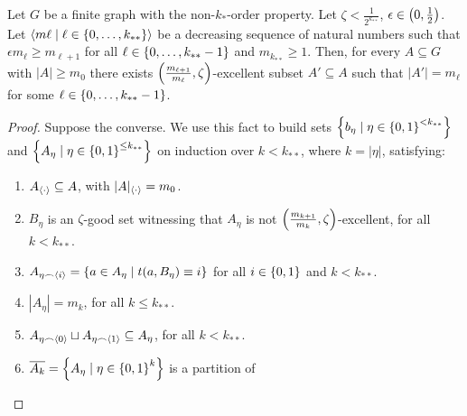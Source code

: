     \begin{lemma}[Claim 5.4.1] \label{lem:existance_of_excellent_subsets_fixed_size_choices}
        Let $G$ be a finite graph with the non-$k_{*}$-order property.
        Let $\zeta < \frac{1}{2^{k_{**}}}$, $\epsilon \in \left( 0, \frac{1}{2} \right)$.
        Let $\left< m\ell \mid \ell \in \left\{ 0, \dots, k_{**} \right\} \right>$ be a decreasing sequence of natural numbers such that
        $\epsilon m_{\ell} \geq m_{\ell+1}$ for all $\ell \in \left\{ 0, \dots, k_{**}-1 \right\}$ and $m_{k_{**}} \geq 1$.
        Then, for every $A \subseteq G$ with $|A| \geq m_0$ there exists
        $\left( \frac{m_{\ell+1}}{m_{\ell}}, \zeta \right)$-excellent subset $A' \subseteq A$ such that $|A'| = m_\ell$ for
        some $\ell \in \left\{ 0, \dots, k_{**}-1 \right\}$.
        \begin{proof}
            Suppose the converse.
            We use this fact to build sets $\left\{ b_\eta \mid \eta \in \left\{ 0,1 \right\}^{<k_{**}} \right\}$ and
            $\left\{ A_\eta \mid \eta \in \left\{ 0,1 \right\}^{\leq k_{**}} \right\}$ on induction over $k<k_{**}$, where $k = |\eta|$,
            satisfying:
            \begin{enumerate}
                \item\label{itm:existance_of_excellent_subsets_fixed_size_choices.1} $A_{\left< \cdot \right>} \subseteq A$, with $|A|_{\left< \cdot \right>} = m_0$.
                \item\label{itm:existance_of_excellent_subsets_fixed_size_choices.2} $B_\eta$ is an $\zeta$-good set witnessing that $A_\eta$ is not
                    $\left( \frac{m_{k+1}}{m_{k}}, \zeta \right)$-excellent, for all $k < k_{**}$.
                \item\label{itm:existance_of_excellent_subsets_fixed_size_choices.3} $A_{\eta \frown \left< i \right>} = \left\{ a \in A_\eta \mid t(a, B_\eta) \equiv i \right\}$
                    for all $i \in \left\{ 0,1 \right\}$ and $k < k_{**}$.
                \item\label{itm:existance_of_excellent_subsets_fixed_size_choices.4} $|A_{\eta}| = m_k$, for all $k \leq k_{**}$.
                \item\label{itm:existance_of_excellent_subsets_fixed_size_choices.6} $A_{\eta \frown \left< 0 \right>} \sqcup A_{\eta \frown \left< 1 \right>} \subseteq A_\eta$,
                    for all $k < k_{**}$.
                \item\label{itm:existance_of_excellent_subsets_fixed_size_choices.7} $\overline{A_k} = \left\{ A_\eta \mid \eta \in \left\{ 0,1 \right\}^k \right\}$ is a partition of

\end{enumerate}
\end{proof}
\end{lemma}
